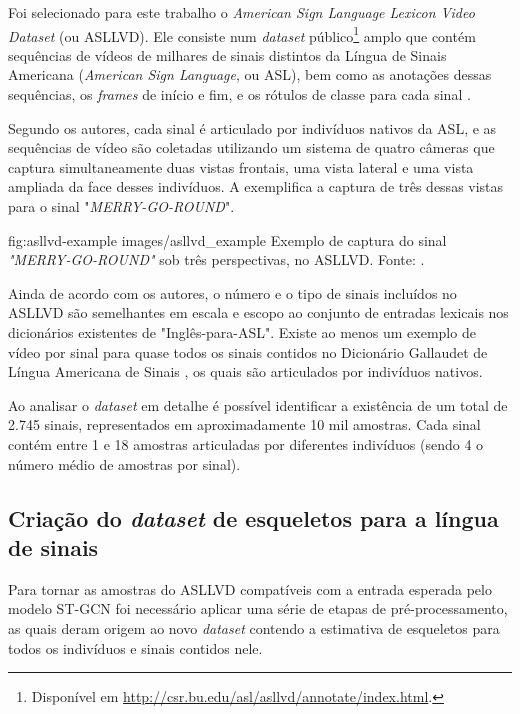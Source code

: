 Foi selecionado para este trabalho o \textit{American Sign Language Lexicon Video Dataset} (ou ASLLVD). Ele consiste num \textit{dataset} público\footnote{
    Disponível em \url{http://csr.bu.edu/asl/asllvd/annotate/index.html}.
} amplo que contém sequências de vídeos de milhares de sinais distintos da Língua de Sinais Americana (\textit{American Sign Language}, ou ASL), bem como as anotações dessas sequências, os \textit{frames} de início e fim, e os rótulos de classe para cada sinal \cite{athitsos-asllvd-2008, neidle-2012, vloger-2012}.

Segundo os autores, cada sinal é articulado por indivíduos nativos da ASL, e as sequências de vídeo são coletadas utilizando um sistema de quatro câmeras que captura simultaneamente duas vistas frontais, uma vista lateral e uma vista ampliada da face desses indivíduos. A  exemplifica a captura de três dessas vistas para o sinal "\textit{MERRY-GO-ROUND}".

\image
    {fig:asllvd-example}
    {images/asllvd_example}
    {Exemplo de captura do sinal \textit{"MERRY-GO-ROUND"} sob três perspectivas, no ASLLVD. Fonte:  \cite[p. 2]{athitsos-asllvd-2008}.}

Ainda de acordo com os autores, o número e o tipo de sinais incluídos no ASLLVD são semelhantes em escala e escopo ao conjunto de entradas lexicais nos dicionários existentes de "Inglês-para-ASL". Existe ao menos um exemplo de vídeo por sinal para quase todos os sinais contidos no Dicionário Gallaudet de Língua Americana de Sinais \cite{athitsos-asllvd-2008, gallaudet-2005}, os quais são articulados por indivíduos nativos. 

Ao analisar o \textit{dataset} em detalhe é possível identificar a existência de um total de 2.745 sinais, representados em aproximadamente 10 mil amostras. Cada sinal contém entre 1 e 18 amostras articuladas por diferentes indivíduos (sendo 4 o número médio de amostras por sinal).


\subsection{Criação do \textit{dataset} de esqueletos para a língua de sinais} %
\label{sec:criacao-dataset}

Para tornar as amostras do ASLLVD compatíveis com a entrada esperada pelo modelo ST-GCN foi necessário aplicar uma série de etapas de pré-processamento, as quais deram origem ao novo \textit{dataset} contendo a estimativa de esqueletos para todos os indivíduos e sinais contidos nele.

